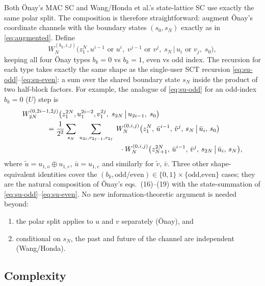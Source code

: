 \documentclass[11pt]{article}
\newcommand{\bbU}{U}
\begin{document}
Both \"{O}nay's MAC SC and Wang/Honda et al.'s state-lattice SC use exactly
the same polar split.  The composition is therefore straightforward:
augment \"{O}nay's coordinate channels with the boundary states $(s_0, s_N)$
exactly as in \eqref{eq:augmented}.  Define
\begin{equation}\label{eq:mac-augmented}
  W_N^{(b_k,i,j)}\bigl(z_1^N, u^{i-1}\text{ or }u^i,\; v^{j-1}\text{ or }v^j,\;
                        s_N \,\big|\, u_i \text{ or } v_j,\; s_0\bigr),
\end{equation}
keeping all four \"{O}nay types $b_k=0$ vs $b_k=1$, even vs odd index.  The
recursion for each type takes exactly the same shape as the single-user
SCT recursion \eqref{eq:su-odd}--\eqref{eq:su-even}: a sum over the
shared boundary state $s_N$ inside the product of two half-block factors.
For example, the analogue of \eqref{eq:su-odd} for an odd-index
$b_k=0$ ($\bbU$) step is
\begin{align}
   &W_{2N}^{(0, 2i-1, 2j)}\bigl(z_1^{2N}, u_1^{2i-2}, v_1^{2j},\; s_{2N} \,\big|\, u_{2i-1},\; s_0\bigr) \nonumber\\
  &\hspace{1.2cm} = \frac{1}{2^2}\sum_{s_N}\;\sum_{u_{2i}, v_{2j-1}, v_{2j}}\;
        W_N^{(0,i,j)}\bigl(z_1^N,\, \tilde u^{i-1},\, \tilde v^{j},\, s_N \,\big|\, \bar u_i,\, s_0\bigr) \nonumber\\
  &\hspace{4.8cm}\cdot
        W_N^{(0,i,j)}\bigl(z_{N+1}^{2N},\, \bar u^{i-1},\, \bar v^{j},\, s_{2N} \,\big|\, \bar u_i,\, s_N\bigr),
   \label{eq:mac-recursion}
\end{align}
where $\tilde u = u_{1,o}\oplus u_{1,e}$, $\bar u = u_{1,e}$ and similarly
for $\tilde v$, $\bar v$.  Three other shape-equivalent identities cover the
$(b_k, \mathrm{odd/even})\in\{0,1\}\times\{\text{odd,even}\}$ cases; they
are the natural composition of \"{O}nay's eqs.~(16)--(19) with the
state-summation of \eqref{eq:su-odd}--\eqref{eq:su-even}.  No new
information-theoretic argument is needed beyond:
\begin{enumerate}[leftmargin=*]
\item the polar split applies to $u$ and $v$ separately (\"{O}nay), and
\item conditional on $s_N$, the past and future of the channel are
      independent (Wang/Honda).
\end{enumerate}

\subsection{Complexity}
\end{document}
